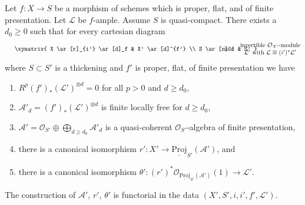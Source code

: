 %
\begin{lemma}
\label{lemma-deform-projective}
Let $f : X \to S$ be a morphism of schemes which is proper, flat, and
of finite presentation. Let $\mathcal{L}$ be $f$-ample. Assume
$S$ is quasi-compact. There exists a $d_0 \geq 0$ such that
for every cartesian diagram
$$
\vcenter{
\xymatrix{
X \ar[r]_{i'} \ar[d]_f & X' \ar[d]^{f'} \\
S \ar[r]^i & S'
}
}
\quad\text{and}\quad
\begin{matrix}
\text{invertible }\mathcal{O}_{X'}\text{-module}\\
\mathcal{L}'\text{ with }\mathcal{L} \cong (i')^*\mathcal{L}'
\end{matrix}
$$
where $S \subset S'$ is a thickening and $f'$ is
proper, flat, of finite presentation we have
\begin{enumerate}
\item $R^p(f')_*(\mathcal{L}')^{\otimes d} = 0$
for all $p > 0$ and $d \geq d_0$,
\item $\mathcal{A}'_d = (f')_*(\mathcal{L}')^{\otimes d}$
is finite locally free for $d \geq d_0$,
\item $\mathcal{A}' =
\mathcal{O}_{S'} \oplus \bigoplus_{d \geq d_0} \mathcal{A}'_d$
is a quasi-coherent $\mathcal{O}_{S'}$-algebra of finite presentation,
\item there is a canonical isomorphism
$r' : X' \to \underline{\text{Proj}}_{S'}(\mathcal{A}')$, and
\item there is a canonical isomorphism
$\theta' : (r')^*\mathcal{O}_{\underline{\text{Proj}}_{S'}(\mathcal{A}')}(1)
\to \mathcal{L}'$.
\end{enumerate}
The construction of $\mathcal{A}'$, $r'$, $\theta'$
is functorial in the data $(X', S', i, i', f', \mathcal{L}')$.
\end{lemma}

